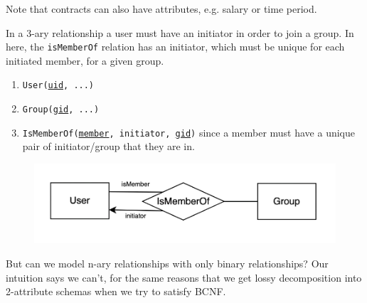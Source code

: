 \documentclass{article}
\begin{document}
\begin{example}
\begin{figure}[H]
          \caption{} 
          \label{fig:four_ary}
        \end{figure}
        Note that contracts can also have attributes, e.g. salary or time period. 
      \end{example}

      \begin{example}
        In a 3-ary relationship a user must have an initiator in order to join a group. In here, the \texttt{isMemberOf} relation has an initiator, which must be unique for each initiated member, for a given group. 
        \begin{enumerate}
          \item \texttt{User(\underline{uid}, ...)} 
          \item \texttt{Group(\underline{gid}, ...)} 
          \item \texttt{IsMemberOf(\underline{member}, initiator, \underline{gid})} since a member must have a unique pair of initiator/group that they are in. 
        \end{enumerate}
        \begin{figure}[H]
          \centering 
          \includegraphics[scale=0.3]{img/three_ary.png}
          \caption{} 
          \label{fig:three_ary}
        \end{figure}
      \end{example}

      But can we model n-ary relationships with only binary relationships? Our intuition says we can't, for the same reasons that we get lossy decomposition into 2-attribute schemas when we try to satisfy BCNF. 
\end{document}
